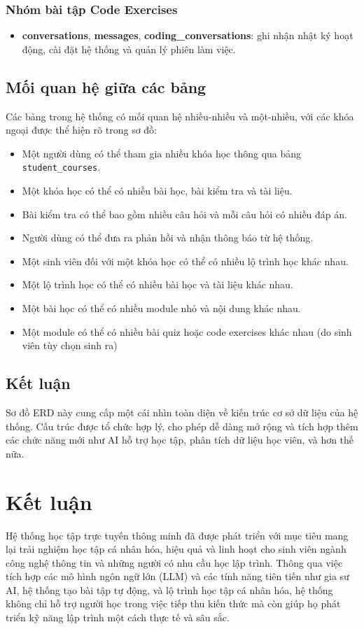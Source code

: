 \subsubsection{Nhóm bài tập Code Exercises}
\begin{itemize}
    \item \textbf{conversations}, \textbf{messages}, \textbf{coding\_conversations}: ghi nhận nhật ký hoạt động, cài đặt hệ thống và quản lý phiên làm việc.
\end{itemize}

\subsection{Mối quan hệ giữa các bảng}
Các bảng trong hệ thống có mối quan hệ nhiều-nhiều và một-nhiều, với các khóa ngoại được thể hiện rõ trong sơ đồ:
\begin{itemize}
    \item Một người dùng có thể tham gia nhiều khóa học thông qua bảng \texttt{student\_courses}.
    \item Một khóa học có thể có nhiều bài học, bài kiểm tra và tài liệu.
    \item Bài kiểm tra có thể bao gồm nhiều câu hỏi và mỗi câu hỏi có nhiều đáp án.
    \item Người dùng có thể đưa ra phản hồi và nhận thông báo từ hệ thống.
    \item Một sinh viên đối với một khóa học có thể có nhiều lộ trình học khác nhau. 
    \item Một lộ trình học có thể có nhiều bài học và tài liệu khác nhau.
    \item Một bài học có thể có nhiều module nhỏ và nội dung khác nhau.
    \item Một module có thể có nhiều bài quiz hoặc code exercises khác nhau (do sinh viên tùy chọn sinh ra)
\end{itemize}

\subsection{Kết luận}
Sơ đồ ERD này cung cấp một cái nhìn toàn diện về kiến trúc cơ sở dữ liệu của hệ thống. Cấu trúc được tổ chức hợp lý, cho phép dễ dàng mở rộng và tích hợp thêm các chức năng mới như AI hỗ trợ học tập, phân tích dữ liệu học viên, và hơn thế nữa.

\section{Kết luận}
Hệ thống học tập trực tuyến thông minh đã được phát triển với mục tiêu mang lại trải nghiệm học tập cá nhân hóa, hiệu quả và linh hoạt cho sinh viên ngành công nghệ thông tin và những người có nhu cầu học lập trình. Thông qua việc tích hợp các mô hình ngôn ngữ lớn (LLM) và các tính năng tiên tiến như gia sư AI, hệ thống tạo bài tập tự động, và lộ trình học tập cá nhân hóa, hệ thống không chỉ hỗ trợ người học trong việc tiếp thu kiến thức mà còn giúp họ phát triển kỹ năng lập trình một cách thực tế và sâu sắc.

